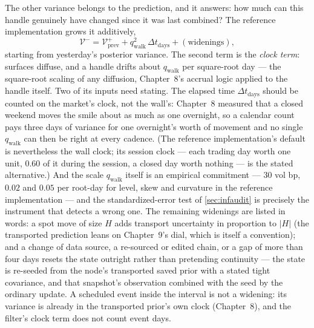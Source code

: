 The other variance belongs to the prediction, and it answers: how
much can this handle genuinely have changed since it was last
combined?  The reference implementation grows it additively,
\begin{equation}
\mathcal{V}^{-}
=\mathcal{V}^{+}_{\mathrm{prev}}
+q_{\mathrm{walk}}^2\,\Delta t_{\mathrm{days}}
+(\text{widenings}),
\label{eq:infpred}
\end{equation}
starting from yesterday's posterior variance.  The second term is
the \emph{clock term}: surfaces diffuse, and a handle drifts about
$q_{\mathrm{walk}}$ per square-root day --- the square-root scaling
of any diffusion, Chapter~8's accrual logic applied to the handle
itself.  Two of its inputs need stating.  The elapsed time
$\Delta t_{\mathrm{days}}$ should be counted on the market's clock,
not the wall's: Chapter~8 measured that a closed weekend moves the
smile about as much as one overnight, so a calendar count pays three
days of variance for one overnight's worth of movement and no
single $q_{\mathrm{walk}}$ can then be right at every cadence.  (The
reference implementation's default is nevertheless the wall clock;
its session clock --- each trading day worth one unit, $0.60$ of it
during the session, a closed day worth nothing --- is the stated
alternative.)  And
the scale $q_{\mathrm{walk}}$ itself is an empirical commitment ---
$30$ vol bp, $0.02$ and $0.05$ per root-day for level, skew and
curvature in the reference implementation --- and
the standardized-error test of \cref{sec:infaudit} is precisely the
instrument that detects a wrong one.  The remaining widenings are
listed in words: a spot move of size $H$ adds transport uncertainty
in proportion to $\lvert H\rvert$ (the transported prediction leans
on Chapter~9's dial, which is itself a convention); and a
change of data source, a re-sourced or edited chain, or a gap of
more than four days resets the state outright rather than
pretending continuity --- the state is re-seeded from the node's
transported saved prior with a stated tight covariance, and that
snapshot's observation combined with the seed by the ordinary
update.  A scheduled event inside the interval is not a widening:
its variance is already in the transported prior's own clock
(Chapter~8), and the filter's clock term does not count event days.

